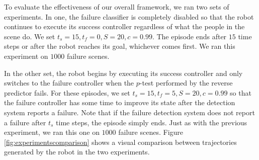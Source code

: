 \documentclass[letterpaper, 10 pt, conference]{ieeeconf}  %
\begin{document}
	To evaluate the effectiveness of our overall framework, we ran two sets of experiments. In one, the failure classifier is completely disabled so that the robot continues to execute its success controller regardless of what the people in the scene do. We set $t_s=15, t_f=0, S=20, c=0.99$. The episode ends after $15$ time steps or after the robot reaches its goal, whichever comes first. We ran this experiment on $1000$ failure scenes.
	
	In the other set, the robot begins by executing its success controller and only switches to the failure controller when the $p$-test performed by the reverse predictor fails. For these episodes, we set $t_s=15, t_f=5, S=20, c=0.99$ so that the failure controller has some time to improve its state after the detection system reports a failure. Note that if the failure detection system does not report a failure after $t_s$ time steps, the episode simply ends. Just as with the previous experiment, we ran this one on $1000$ failure scenes. Figure \ref{fig:experimentscomparison} shows a visual comparison between trajectories generated by the robot in the two experiments.
	
\end{document}
